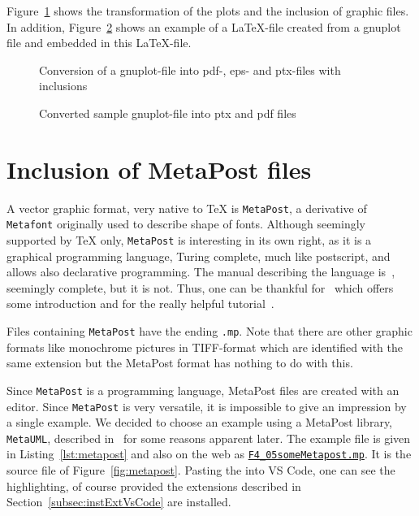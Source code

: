 Figure~\ref{fig:gp2pdf} shows the transformation of the plots 
and the inclusion of graphic files. 
In addition, Figure~\ref{fig:gnuplot} shows an example of a \LaTeX-file 
created from a gnuplot file 
and embedded in this \LaTeX-file. 

\begin{figure}[htb]
\centering
{}
\caption{\label{fig:gp2pdf}Conversion of a gnuplot-file 
into pdf-, eps- and ptx-files with inclusions}
\end{figure}

\begin{figure}[htb]
\centering
{}
\caption{\label{fig:gnuplot}
Converted sample gnuplot-file into ptx and pdf files }
\end{figure}


\section{Inclusion of MetaPost files}\label{sec:metapost}

A vector graphic format, very native to TeX is \texttt{MetaPost}, 
a derivative of \texttt{Metafont} originally used to describe shape of fonts. 
Although seemingly supported by \TeX{} only, 
\texttt{MetaPost} is interesting in its own right, 
as it is a graphical programming language, 
Turing complete, much like postscript, and allows also declarative programming. 
The manual describing the language is~\cite{MPost24}, 
seemingly complete, but it is not. 
Thus, one can be thankful for~\cite{MPostGuid} 
which offers some introduction and for the really helpful tutorial~\cite{MPostTut}. 

Files containing \texttt{MetaPost} have the ending \texttt{.mp}. 
Note that there are other graphic formats 
like monochrome pictures in TIFF-format 
which are identified with the same extension 
but the MetaPost format has nothing to do with this. 

Since \texttt{MetaPost} is a programming language, 
MetaPost files are created with an editor. 
Since \texttt{MetaPost} is very versatile, 
it is impossible to give an impression by a single example. 
We decided to choose an example 
using a MetaPost library, \texttt{MetaUML}, 
described in~\cite{MetaUml} for some reasons apparent later. 
The example file is given in Listing~\ref{lst:metapost} 
and also on the web as 
\href{\urlSite fromTex/F4_05someMetapost.mp}{\texttt{F4\_05someMetapost.mp}}. 
It is the source file of Figure~\ref{fig:metapost}. 
Pasting the into VS Code, one can see the highlighting, 
of course provided the extensions 
described in Section~\ref{subsec:instExtVsCode} are installed. 



